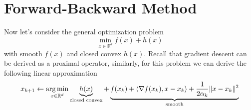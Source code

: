 \section{Forward-Backward Method}
Now let's consider the general optimization problem
\begin{equation*}
    \min_{x \in \mathbb{R}^d} f(x) + h(x)
\end{equation*}
with smooth $f(x)$ and closed convex $h(x)$. Recall that gradient descent can be derived as a proximal operator, similarly, for this problem we can derive the following linear approximation
\begin{equation*}
    x_{k+1} \leftarrow \operatorname*{arg\,min}_{x \in \mathbb{R}^d} \underbrace{h(x)}_{\text{closed convex}} + \underbrace{f(x_k) + \langle \nabla f(x_k), x-x_k \rangle + \frac{1}{2\alpha_k} \| x - x_k \|^2}_{\text{smooth}}
\end{equation*}
